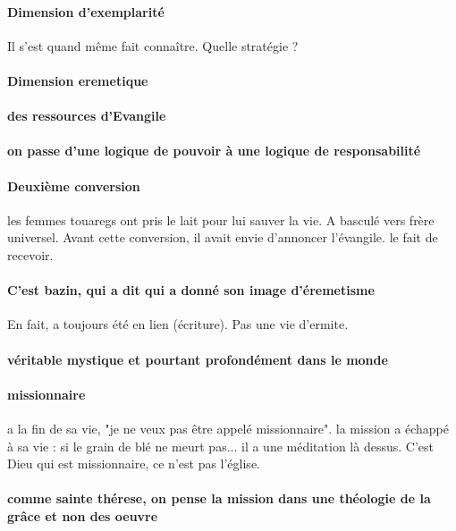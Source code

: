 \paragraph{Dimension d'exemplarité} Il s'est quand même fait connaître. Quelle stratégie ?

\paragraph{Dimension eremetique}

\paragraph{des ressources d'Evangile}

\paragraph{on passe d'une logique de pouvoir à une logique de responsabilité}

\paragraph{Deuxième conversion} les femmes touaregs ont pris le lait pour lui sauver la vie. A basculé vers frère universel. Avant cette conversion, il avait envie d'annoncer l'évangile. le fait de recevoir.

\paragraph{C'est bazin, qui a dit qui a donné son image d'éremetisme} En fait, a toujours été en lien (écriture). Pas une vie d'ermite. 

\paragraph{véritable mystique et pourtant profondément dans le monde}

\paragraph{missionnaire} a la fin de sa vie, "je ne veux pas être appelé missionnaire". la mission a échappé à sa vie : si le grain de blé ne meurt pas... il a une méditation là dessus.
C'est Dieu qui est missionnaire, ce n'est pas l'église.

\paragraph{comme sainte thérese, on pense la mission dans une théologie de la grâce et non des oeuvre}

